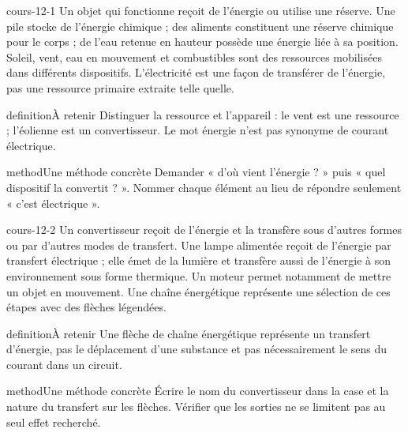 \documentclass[12pt,twoside,openany]{book}
\begin{document}
\begin{pcFiche}{cours-12-1}
Un objet qui fonctionne reçoit de l’énergie ou utilise une réserve. Une pile stocke de l’énergie chimique ; des aliments constituent une réserve chimique pour le corps ; de l’eau retenue en hauteur possède une énergie liée à sa position. Soleil, vent, eau en mouvement et combustibles sont des ressources mobilisées dans différents dispositifs. L’électricité est une façon de transférer de l’énergie, pas une ressource primaire extraite telle quelle.\par
{}
\begin{pcEncadre}{definition}{À retenir}
Distinguer la ressource et l’appareil : le vent est une ressource ; l’éolienne est un convertisseur. Le mot énergie n’est pas synonyme de courant électrique.\par
\end{pcEncadre}
\begin{pcEncadre}{method}{Une méthode concrète}
Demander « d’où vient l’énergie ? » puis « quel dispositif la convertit ? ». Nommer chaque élément au lieu de répondre seulement « c’est électrique ».\par
\end{pcEncadre}
\end{pcFiche}
\label{ch-12-cours-2}
\begin{pcFiche}{cours-12-2}
Un convertisseur reçoit de l’énergie et la transfère sous d’autres formes ou par d’autres modes de transfert. Une lampe alimentée reçoit de l’énergie par transfert électrique ; elle émet de la lumière et transfère aussi de l’énergie à son environnement sous forme thermique. Un moteur permet notamment de mettre un objet en mouvement. Une chaîne énergétique représente une sélection de ces étapes avec des flèches légendées.\par
{}
\begin{pcEncadre}{definition}{À retenir}
Une flèche de chaîne énergétique représente un transfert d’énergie, pas le déplacement d’une substance et pas nécessairement le sens du courant dans un circuit.\par
\end{pcEncadre}
\begin{pcEncadre}{method}{Une méthode concrète}
Écrire le nom du convertisseur dans la case et la nature du transfert sur les flèches. Vérifier que les sorties ne se limitent pas au seul effet recherché.\par
\end{pcEncadre}
\end{pcFiche}
\end{document}
